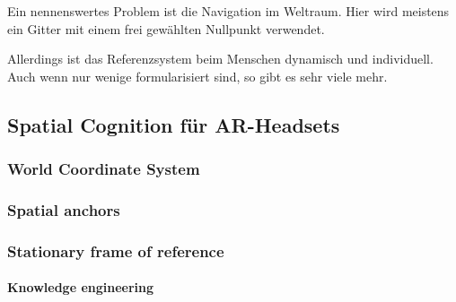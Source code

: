         Ein nennenswertes Problem ist die Navigation im Weltraum.
        Hier wird meistens ein Gitter mit einem frei gewählten Nullpunkt verwendet.

        Allerdings ist das Referenzsystem beim Menschen dynamisch und individuell.
        Auch wenn nur wenige formularisiert sind, so gibt es sehr viele mehr.

\subsection{Spatial Cognition für AR-Headsets}\label{subsec:spatial-cognition-fuer-ar-headsets}

    \subsubsection{World Coordinate System}\label{subsubsec:world-coordinate-system}

    \subsubsection{Spatial anchors}\label{subsubsec:spatial-anchors}

    \subsubsection{Stationary frame of reference}\label{subsubsec:stationary-frame-of-reference}

        \paragraph{Knowledge engineering}~\autocite{wikipedia-contributors-2023C}